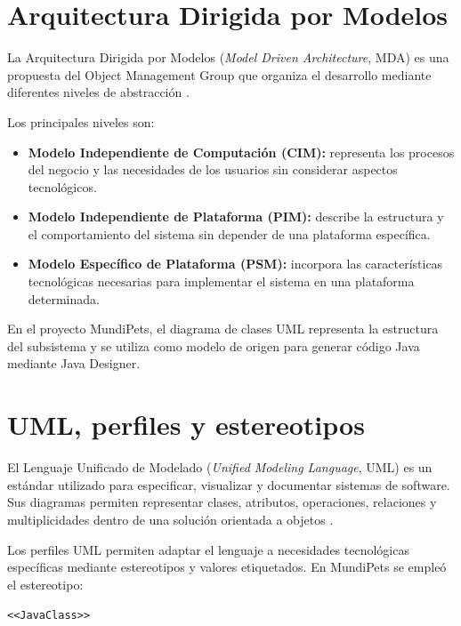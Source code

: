 \documentclass[10pt,a4paper,openany]{report}
\begin{document}
	\section{Arquitectura Dirigida por Modelos}
	
	La Arquitectura Dirigida por Modelos
	(\textit{Model Driven Architecture}, MDA) es una propuesta del Object
	Management Group que organiza el desarrollo mediante diferentes niveles
	de abstracción \cite{omgmda2014}.
	
	Los principales niveles son:
	
	\begin{itemize}
		
		\item \textbf{Modelo Independiente de Computación (CIM):}
		representa los procesos del negocio y las necesidades de los
		usuarios sin considerar aspectos tecnológicos.
		
		\item \textbf{Modelo Independiente de Plataforma (PIM):}
		describe la estructura y el comportamiento del sistema sin depender
		de una plataforma específica.
		
		\item \textbf{Modelo Específico de Plataforma (PSM):}
		incorpora las características tecnológicas necesarias para
		implementar el sistema en una plataforma determinada.
		
	\end{itemize}
	
	En el proyecto MundiPets, el diagrama de clases UML representa la
	estructura del subsistema y se utiliza como modelo de origen para
	generar código Java mediante Java Designer.
	
	\section{UML, perfiles y estereotipos}
	
	El Lenguaje Unificado de Modelado
	(\textit{Unified Modeling Language}, UML) es un estándar utilizado para
	especificar, visualizar y documentar sistemas de software. Sus diagramas
	permiten representar clases, atributos, operaciones, relaciones y
	multiplicidades dentro de una solución orientada a objetos
	\cite{omguml2017}.
	
	Los perfiles UML permiten adaptar el lenguaje a necesidades tecnológicas
	específicas mediante estereotipos y valores etiquetados. En MundiPets se
	empleó el estereotipo:
	
	\begin{center}
		\texttt{\textless\textless JavaClass\textgreater\textgreater}
	\end{center}
	
\end{document}
